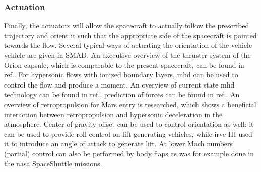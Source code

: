 \subsubsection{Actuation}
Finally, the actuators will allow the spacecraft to actually follow the prescribed trajectory and orient it such that the appropriate side of the spacecraft is pointed towards the flow. Several typical ways of actuating the orientation of the vehicle vehicle are given in SMAD.\cite{Wertz2011} An executive overview of the thruster system of the Orion capsule, which is comparable to the present spacecraft, can be found in ref.\cite{Jones2012}. For hypersonic flows with ionized boundary layers, \gls{mhd} can be used to control the flow and produce a moment. An overview of current state \gls{mhd} technology can be found in ref.\cite{Braun2009}, prediction of forces can be found in ref.\cite{Kawamura2013}. An overview of retropropulsion for Mars entry is researched, which shows a beneficial interaction between retropropulsion and hypersonic deceleration in the atmosphere.\cite{Nise2011} Center of gravity offset can be used to control orientation as well: it can be used to provide roll control on lift-generating vehicles\cite{Petsopoulos1996}, while \gls{irve}-III used it to introduce an angle of attack to generate lift.\cite{Dillman2012a} At lower Mach numbers (partial) control can also be performed by body flaps as was for example done in the \gls{nasa} SpaceShuttle missions.